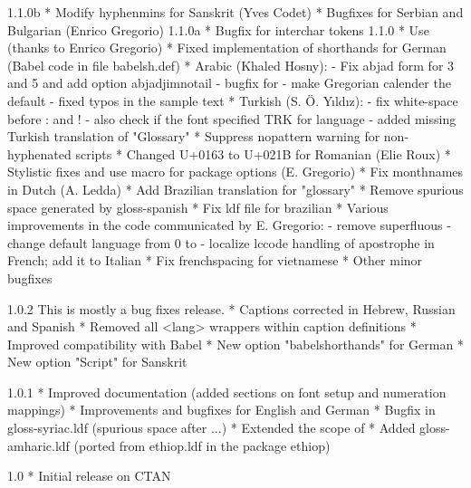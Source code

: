 1.1.0b
   * Modify hyphenmins for Sanskrit (Yves Codet)
   * Bugfixes for Serbian and Bulgarian (Enrico Gregorio)
1.1.0a
   * Bugfix for interchar tokens
1.1.0
   * Use \newXeTeXintercharclass (thanks to Enrico Gregorio)
   * Fixed implementation of shorthands for German (Babel code in file babelsh.def)
   * Arabic (Khaled Hosny):
     - Fix abjad form for 3 and 5 and add option abjadjimnotail
     - bugfix for \arabicnumber
     - make Gregorian calender the default
     - fixed typos in the sample text
   * Turkish (S. Ö. Yıldız):
     - fix white-space before : and !
     - also check if the font specified TRK for language
     - added missing Turkish translation of "Glossary"
   * Suppress nopattern warning for non-hyphenated scripts
   * Changed U+0163 to U+021B for Romanian (Elie Roux)
   * Stylistic fixes and use macro \xpg@option for package options (E. Gregorio)
   * Fix monthnames in Dutch (A. Ledda)
   * Add Brazilian translation for "glossary"
   * Remove spurious space generated by gloss-spanish
   * Fix ldf file for brazilian
   * Various improvements in the code communicated by E. Gregorio:
     - remove superfluous \protect\language
     - change default language from 0 to 
     - localize lccode handling of apostrophe in French; add it to Italian
   * Fix frenchspacing for vietnamese
   * Other minor bugfixes

1.0.2
   This is mostly a bug fixes release.
   * Captions corrected in Hebrew, Russian and Spanish
   * Removed all \text<lang> wrappers within caption definitions
   * Improved compatibility with Babel
   * New option "babelshorthands" for German
   * New option "Script" for Sanskrit

1.0.1
   * Improved documentation (added sections on font setup and numeration mappings)
   * Improvements and bugfixes for English and German
   * Bugfix in gloss-syriac.ldf (spurious space after \textsyriac{...})
   * Extended the scope of \syriacabjad
   * Added gloss-amharic.ldf (ported from ethiop.ldf in the package ethiop)

1.0
   * Initial release on CTAN
